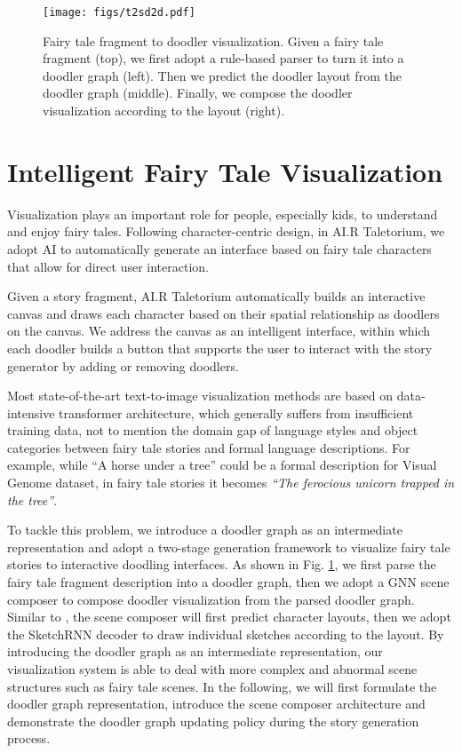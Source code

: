 \begin{figure}[t]
\begin{center}
   \texttt{[image: figs/t2sd2d.pdf]}
\end{center}
\caption{Fairy tale fragment to doodler visualization. Given a fairy tale fragment (top), we first adopt a rule-based parser to turn it into a doodler graph (left). Then we predict the doodler layout from the doodler graph (middle). Finally, we compose the doodler visualization according to the layout (right).}
\label{fig:dg_pipeline}
\end{figure}

\section{Intelligent Fairy Tale Visualization}

Visualization plays an important role for people, especially kids, to understand and enjoy fairy tales. Following character-centric design, in AI.R Taletorium, we adopt AI to automatically generate an interface based on fairy tale characters that allow for direct user interaction.

Given a story fragment, AI.R Taletorium automatically builds an interactive canvas and draws each character based on their spatial relationship as doodlers on the canvas. We address the canvas as an intelligent interface, within which each doodler builds a button that supports the user to interact with the story generator by adding or removing doodlers.

Most state-of-the-art text-to-image visualization methods are based on data-intensive transformer architecture, which generally suffers from insufficient training data, not to mention the domain gap of language styles and object categories between fairy tale stories and formal language descriptions. For example, while ``A horse under a tree'' could be a formal description for Visual Genome dataset\cite{Krishna2017}, in fairy tale stories it becomes \textit{``The ferocious unicorn trapped in the tree''}. 

To tackle this problem, we introduce a doodler graph as an intermediate representation and adopt a two-stage generation framework to visualize fairy tale stories to interactive doodling interfaces. As shown in Fig. \ref{fig:dg_pipeline}, we first parse the fairy tale fragment description into a doodler graph, then we adopt a GNN scene composer to compose doodler visualization from the parsed doodler graph. Similar to \cite{Huang2019}, the scene composer will first predict character layouts, then we adopt the SketchRNN \cite{Ha2018ANR} decoder to draw individual sketches according to the layout. By introducing the doodler graph as an intermediate representation, our visualization system is able to deal with more complex and abnormal scene structures such as fairy tale scenes. In the following, we will first formulate the doodler graph representation, introduce the scene composer architecture and demonstrate the doodler graph updating policy during the story generation process.

